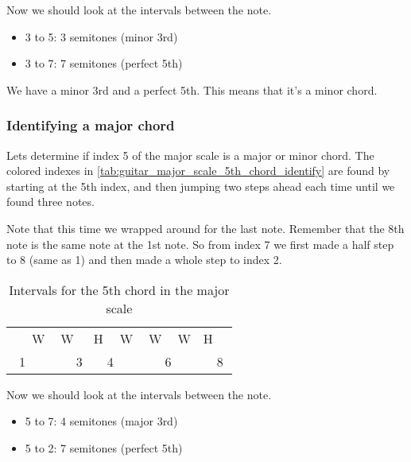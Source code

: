 Now we should look at the intervals between the note.

\begin{itemize}
	\item 3 to 5: 3 semitones (minor 3rd)
	\item 3 to 7: 7 semitones (perfect 5th)
\end{itemize}

We have a minor 3rd and a perfect 5th. This means that it's a minor chord.

\subsubsection{Identifying a major chord}
Lets determine if index 5 of the major scale is a major or minor chord. The colored indexes in \autoref{tab:guitar_major_scale_5th_chord_identify} are found by starting at the 5th index, and then jumping two steps ahead each time until we found three notes.

Note that this time we wrapped around for the last note. Remember that the 8th note is the same note at the 1st note. So from index 7 we first made a half step to 8 (same as 1) and then made a whole step to index 2.

\begin{table}[h]
	\centering
	\begin{tabular}{*{16}{c}}
		& \multicolumn{2}{P{4mm}}{\large{W}} & \multicolumn{2}{P{4mm}}{\large{W}} & \multicolumn{2}{P{4mm}}{\large{H}} & \multicolumn{2}{P{4mm}}{\large{W}} & \multicolumn{2}{P{4mm}}{\large{W}} & \multicolumn{2}{P{4mm}}{\large{W}} & \multicolumn{2}{P{4mm}}{\large{H}} & \\
		\multicolumn{2}{P{4mm}}{1} & \multicolumn{2}{P{4mm}}{\ScaleCellFill 2} & \multicolumn{2}{P{4mm}}{3} & \multicolumn{2}{P{4mm}}{4} & \multicolumn{2}{P{4mm}}{\ScaleRootCellFill 5} & \multicolumn{2}{P{4mm}}{6} & \multicolumn{2}{P{4mm}}{\ScaleCellFill 7} & \multicolumn{2}{P{4mm}}{8}
	\end{tabular}
	\caption{Intervals for the 5th chord in the major scale}
	\label{tab:guitar_major_scale_5th_chord_identify}
\end{table}

Now we should look at the intervals between the note.

\begin{itemize}
	\item 5 to 7: 4 semitones (major 3rd)
	\item 5 to 2: 7 semitones (perfect 5th)
\end{itemize}

